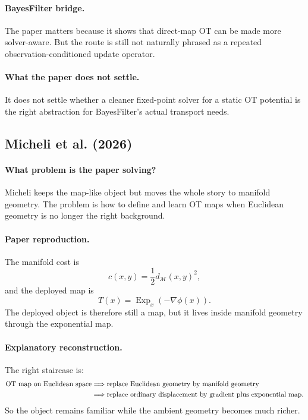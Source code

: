 \documentclass[11pt]{report}
\begin{document}
\paragraph{BayesFilter bridge.}
The paper matters because it shows that direct-map OT can be made more solver-aware.
But the route is still not naturally phrased as a repeated observation-conditioned
update operator.

\paragraph{What the paper does not settle.}
It does not settle whether a cleaner fixed-point solver for a static OT potential is
the right abstraction for BayesFilter's actual transport needs.

\subsection*{Micheli et al. (2026)}

\paragraph{What problem is the paper solving?}
Micheli keeps the map-like object but moves the whole story to manifold geometry.
The problem is how to define and learn OT maps when Euclidean geometry is no longer
the right background.

\paragraph{Paper reproduction.}
The manifold cost is
\begin{equation}
c(x,y)=\frac12 d_{\mathcal M}(x,y)^2,
\label{eq:micheli-cost}
\end{equation}
and the deployed map is
\begin{equation}
T(x)=\operatorname{Exp}_x(-\nabla\phi(x)).
\label{eq:micheli-map}
\end{equation}
The deployed object is therefore still a map, but it lives inside manifold geometry
through the exponential map.

\paragraph{Explanatory reconstruction.}
The right staircase is:
\begin{align}
\text{OT map on Euclidean space}
&\Longrightarrow
\text{replace Euclidean geometry by manifold geometry}
\notag\\
&\Longrightarrow
\text{replace ordinary displacement by gradient plus exponential map}.
\label{eq:micheli-logic}
\end{align}
So the object remains familiar while the ambient geometry becomes much richer.
\end{document}
